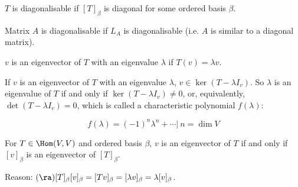\documentclass[11pt]{scrartcl}
\begin{document}
\begin{remark*}
  \(T\) is diagonalisable if \([T]_{\beta}\) is diagonal for some
  ordered basis \(\beta\).

  Matrix \(A\) is diagonalisable if \(L_{A}\) is diagonalisable
  (i.e. \(A\) is similar to a diagonal matrix).

  \(v\) is an eigenvector of \(T\) with an eigenvalue \(\lambda\) if
  \(T(v) = \lambda v\).

  If \(v\) is an eigenvector of \(T\) with an eigenvalue \(\lambda\),
  \(v\in \ker(T - \lambda I_{v})\). So \(\lambda\) is an eigenvalue of
  \(T\) if and only if \(\ker(T- \lambda I_{v})\neq 0\), or,
  equivalently, \(\det(T-\lambda I_{v}) = 0\), which is called a
  characteristic polynomial \(f(\lambda)\):

  \begin{equation*}
    f(\lambda) = (-1)^{n}\lambda^{n} + \cdots |\  n=\dim V
  \end{equation*}

\end{remark*}

\begin{note*}
  For \(T\in\Hom(V,V)\) and ordered basis \(\beta\), \(v\) is an
  eigenvector of \(T\) if and only if \([v]_{\beta}\) is an
  eigenvector of \([T]_{\beta}\).

  Reason: \((\ra) [T]_{\beta}[v]_{\beta} = [Tv]_{\beta} = [\lambda v]_{\beta} = \lambda[v]_{\beta}\).
\end{note*}
\end{document}
